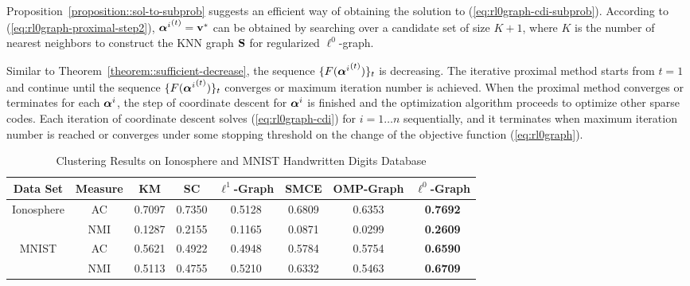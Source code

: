 \documentclass[10pt,twocolumn,letterpaper]{article}
\begin{document}
Proposition~\ref{proposition::sol-to-subprob} suggests an efficient way of obtaining the solution to (\ref{eq:rl0graph-cdi-subprob}). According to (\ref{eq:rl0graph-proximal-step2}), ${\bm{\alpha}^i}^{(t)} = \mathbf{v}^{*}$ can be obtained by searching over a candidate set of size $K+1$, where $K$ is the number of nearest neighbors to construct the KNN graph $\mathbf{S}$ for regularized $\ell^{0}$-graph.

Similar to Theorem~\ref{theorem::sufficient-decrease}, the sequence $\{F({\bm{\alpha}^i}^{(t)})\}_t$ is decreasing. The iterative proximal method starts from $t=1$ and continue until the sequence $\{F({\bm{\alpha}^i}^{(t)})\}_t$ converges or maximum iteration number is achieved. When the proximal method converges or terminates for each $\bm{\alpha}^i$, the step of coordinate descent for $\bm{\alpha}^i$ is finished and the optimization algorithm proceeds to optimize other sparse codes. Each iteration of coordinate descent solves (\ref{eq:rl0graph-cdi}) for $i=1 \ldots n$ sequentially, and it terminates when maximum iteration number is reached or converges under some stopping threshold on the change of the objective function (\ref{eq:rl0graph}).


\begin{table*}[ht]
\centering
\caption{\small Clustering Results on Ionosphere and MNIST Handwritten Digits Database}
\begin{tabular}{|c|c|c|c|c|c|c|c|}
  \hline
  Data Set

                              &Measure & KM    & SC     &$\ell^{1}$-Graph   &SMCE    &OMP-Graph   &$\ell^{0}$-Graph   \\\hline

  \multirow{2}{*}{Ionosphere} &AC      &0.7097 &0.7350  &0.5128             &0.6809  &0.6353      &\textbf{0.7692} \\ \cline{2-8}
                              &NMI     &0.1287 &0.2155  &0.1165             &0.0871  &0.0299      &\textbf{0.2609} \\ \hline

  \multirow{2}{*}{MNIST}      &AC      &0.5621 &0.4922  &0.4948             &0.5784  &0.5754      &\textbf{0.6590} \\ \cline{2-8}
                              &NMI     &0.5113 &0.4755  &0.5210             &0.6332  &0.5463      &\textbf{0.6709} \\ \hline

\end{tabular}
\label{table:uci-mnist}
\end{table*}
\end{document}
